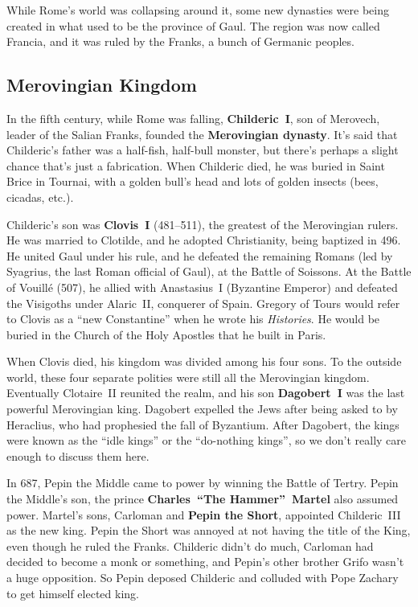While Rome's world was collapsing around it,
some new dynasties were being created in what used to be the province of Gaul.
The region was now called Francia, and it was ruled by the Franks, a bunch of Germanic peoples.

\subsection*{Merovingian Kingdom}

In the fifth century, while Rome was falling,
\textbf{Childeric~I}, son of Merovech, leader of the Salian Franks,
founded the \textbf{Merovingian dynasty}.
It's said that Childeric's father was a half-fish, half-bull monster,
but there's perhaps a slight chance that's just a fabrication.
When Childeric died, he was buried in Saint Brice in Tournai,
with a golden bull's head and lots of golden insects (bees, cicadas, etc.).

Childeric's son was \textbf{Clovis~I} (481--511), the greatest of the Merovingian rulers.
He was married to Clotilde, and he adopted Christianity, being baptized in 496.
He united Gaul under his rule, and he defeated the remaining Romans
(led by Syagrius, the last Roman official of Gaul),
at the Battle of Soissons.
At the Battle of Vouill\'e (507), he allied with Anastasius~I (Byzantine Emperor)
and defeated the Visigoths under Alaric~II, conquerer of Spain.
Gregory of Tours would refer to Clovis as a ``new Constantine'' when he wrote his \textit{Histories}.
He would be buried in the Church of the Holy Apostles that he built in Paris.

When Clovis died, his kingdom was divided among his four sons.
To the outside world, these four separate polities were still all the Merovingian kingdom.
Eventually Clotaire~II reunited the realm,
and his son \textbf{Dagobert~I} was the last powerful Merovingian king.
Dagobert expelled the Jews after being asked to by Heraclius, who had prophesied the fall of Byzantium.
After Dagobert, the kings were known as the ``idle kings'' or the ``do-nothing kings'',
so we don't really care enough to discuss them here.

In 687, Pepin the Middle came to power by winning the Battle of Tertry.
Pepin the Middle's son, the prince \textbf{Charles~``The Hammer''~Martel} also assumed power.
Martel's sons, Carloman and \textbf{Pepin the Short}, appointed Childeric~III as the new king.
Pepin the Short was annoyed at not having the title of the King, even though he ruled the Franks.
Childeric didn't do much, Carloman had decided to become a monk or something,
and Pepin's other brother Grifo wasn't a huge opposition.
So Pepin deposed Childeric and colluded with Pope Zachary to get himself elected king.

